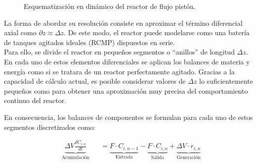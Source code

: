 \begin{figure}[htbp]
    \caption{Esquematización en dinámico del reactor de flujo pistón.}
    \label{fig:rcfp-dinamico}
\end{figure}
\begin{flushleft}
    La forma de abordar su resolución consiste en aproximar el término diferencial axial como $\partial z\approx \Delta z$. De este modo, el reactor puede modelarse como una batería de tanques agitados ideales (RCMP) dispuestos en serie.\\

    Para ello, se divide el reactor en pequeños segmentos o “anillos” de longitud $\Delta z$. En cada uno de estos elementos diferenciales se aplican los balances de materia y energía como si se tratara de un reactor perfectamente agitado. Gracias a la capacidad de cálculo actual, es posible considerar valores de $\Delta z$ lo suficientemente pequeños como para obtener una aproximación muy precisa del comportamiento continuo del reactor.

    En consecuencia, los balances de componentes se formulan para cada uno de estos segmentos discretizados como:
\end{flushleft}
\begin{equation}
    \begin{alignedat}{2}
         & \underbrace{\Delta V \frac{d C_{i,n}}{d t}}_{\text{Acumulación}} &  & = \underbrace{F \cdot C_{i,n-1}}_{\text{Entrada}} - \underbrace{F \cdot C_{i,n}}_{\text{Salida}} + \underbrace{\Delta V \cdot r_{i,n}}_{\text{Generación}}
    \end{alignedat}
\end{equation}

